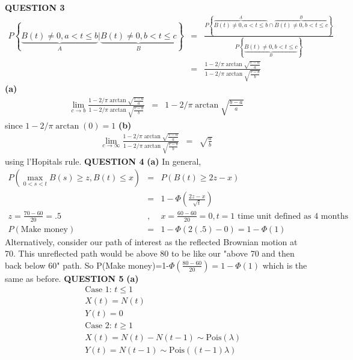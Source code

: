 \documentclass{amsart}
\theoremstyle{definition}
\theoremstyle{remark}
\numberwithin{equation}{section}
\begin{document}
{\bf QUESTION 3}
\newline
\begin{eqnarray}
\nonumber P\left\{\underbrace{B(t)\neq 0, a<t\leq b}_{A}
|\underbrace{ B(t)\neq 0, b<t\leq c}_{B}\right\} &=&
\frac{P\left\{\overbrace{B(t)\neq 0, a<t\leq b}^{A} \cap
\overbrace{B(t)\neq 0,
b<t\leq c}^{B}\right\}}{P\left\{\underbrace{B(t)\neq 0, b<t\leq c}_{B} \right\}} \\
\nonumber &=& \frac{1-2/\pi \arctan\sqrt{\frac{c-a}{a}}}{1-2/\pi
\arctan\sqrt{\frac{c-b}{b}}}
\end{eqnarray}
 {\bf (a)}
\newline
\begin{eqnarray}
\nonumber \lim_{c\rightarrow b}\frac{1-2/\pi
\arctan\sqrt{\frac{c-a}{a}}}{1-2/\pi
\arctan\sqrt{\frac{c-b}{b}}}&=&1-2/\pi \arctan\sqrt{\frac{b-a}{a}}
\end{eqnarray}
since $1-2/\pi \arctan(0) = 1$
\newline
{\bf (b)}
\begin{eqnarray}
\nonumber \lim_{c\rightarrow \infty}\frac{1-2/\pi
\arctan\sqrt{\frac{c-a}{a}}}{1-2/\pi
\arctan\sqrt{\frac{c-b}{b}}}&=&\sqrt{\frac{a}{b}}
\end{eqnarray}
using l'Hopitals rule. \newline \newline
\bigskip
{\bf QUESTION 4}
\newline
{\bf (a)}
\newline
In general,
\begin{eqnarray}
\nonumber P(\max_{0<s<t}B(s)\geq z, B(t) \leq x)&=&P(B(t)\geq
2z-x)\\
\nonumber &=&1-\Phi\left(\frac{2z-x}{\sqrt{t}}\right) \\
\nonumber z=\frac{70-60}{20}=.5 &,&x=\frac{60-60}{20}=0,t=1 \text{ time unit defined as 4 months}\\
\nonumber P(\text{Make
money})&=&1-\Phi\left(2(.5)-0\right)=1-\Phi\left(1\right)
\end{eqnarray}
\newline
Alternatively, consider our path of interest as the reflected
Brownian motion at 70. This unreflected path would be above 80 to
be like our "above 70 and then back below 60" path. So  P(Make
money)=1-$\Phi(\frac{80-60}{20})=1-\Phi(1)$ which is the same as
before. \newline \newline
\bigskip
{\bf QUESTION 5}
\newline
{\bf (a)}
\begin{eqnarray}
\nonumber && \text{Case 1: } t \leq 1 \\
\nonumber && X(t)=N(t) \\
\nonumber && Y(t)=0 \\
\nonumber && \text{Case 2: } t \geq 1 \\
\nonumber && X(t)=N(t)-N(t-1) \sim \text{Pois}(\lambda) \\
\nonumber && Y(t)=N(t-1) \sim \text{Pois}((t-1)\lambda)
\end{eqnarray}
\end{document}
